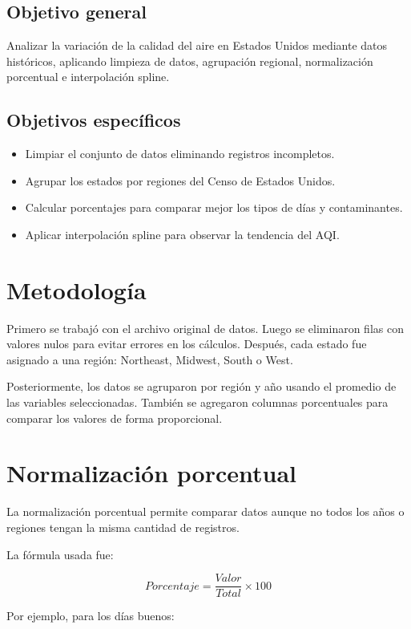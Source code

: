 \documentclass[12pt]{report}
\begin{document}
\subsection{Objetivo general}

Analizar la variación de la calidad del aire en Estados Unidos mediante datos históricos, aplicando limpieza de datos, agrupación regional, normalización porcentual e interpolación spline.

\subsection{Objetivos específicos}

\begin{itemize}
    \item Limpiar el conjunto de datos eliminando registros incompletos.
    \item Agrupar los estados por regiones del Censo de Estados Unidos.
    \item Calcular porcentajes para comparar mejor los tipos de días y contaminantes.
    \item Aplicar interpolación spline para observar la tendencia del AQI.
\end{itemize}

\section{Metodología}

Primero se trabajó con el archivo original de datos. Luego se eliminaron filas con valores nulos para evitar errores en los cálculos. Después, cada estado fue asignado a una región: Northeast, Midwest, South o West.

Posteriormente, los datos se agruparon por región y año usando el promedio de las variables seleccionadas. También se agregaron columnas porcentuales para comparar los valores de forma proporcional.

\section{Normalización porcentual}

La normalización porcentual permite comparar datos aunque no todos los años o regiones tengan la misma cantidad de registros.

La fórmula usada fue:

\[
Porcentaje = \frac{Valor}{Total} \times 100
\]

Por ejemplo, para los días buenos:
\end{document}
